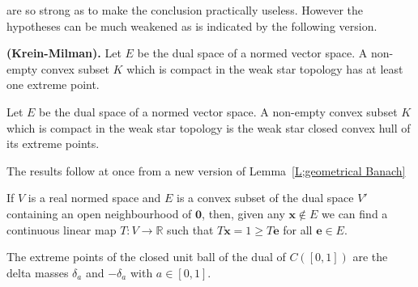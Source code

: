 are so strong as to make the conclusion practically useless.
However the hypotheses can be much weakened as is indicated
by the following version.
\begin{theorem}{\bf (Krein-Milman).} Let $E$
be the dual space of a normed vector space.
A non-empty
convex subset $K$ which is compact in the weak star topology
has at least one extreme point.
\end{theorem}
\begin{theorem} Let $E$
be the dual space of a normed vector space.
A non-empty
convex subset $K$ which is compact in the weak star topology
is the weak star closed convex hull of its extreme points.
\end{theorem}
The results follow at once from a new version of 
Lemma~\ref{L;geometrical Banach}
\begin{added}[Lemma]
If $V$ is a real normed space
and $E$ is a convex subset of the dual space $V'$ containing
an open neighbourhood of ${\boldsymbol 0}$,
then, given any ${\mathbf x}\notin E$ we can find
a continuous linear map $T:V\rightarrow{\mathbb R}$
such that $T{\mathbf x}=1\geq T{\mathbf e}$ for
all ${\mathbf e}\in E$.
\end{added}

\begin{lemma} The extreme points of the closed
unit ball of the dual of $C([0,1])$ are the delta masses
$\delta_{a}$ and $-\delta_{a}$ with $a\in[0,1]$.
\end{lemma}
 


